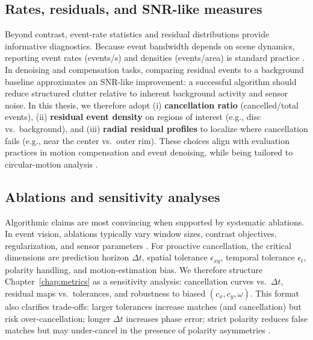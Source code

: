 \subsection{Rates, residuals, and SNR-like measures}
Beyond contrast, event-rate statistics and residual distributions provide informative diagnostics. Because event bandwidth depends on scene dynamics, reporting event rates (events/s) and densities (events/area) is standard practice \cite{Gallego2020Survey}. In denoising and compensation tasks, comparing residual events to a background baseline approximates an SNR-like improvement: a successful algorithm should reduce structured clutter relative to inherent background activity and sensor noise. In this thesis, we therefore adopt (i) \textbf{cancellation ratio} (cancelled/total events), (ii) \textbf{residual event density} on regions of interest (e.g., disc vs.\ background), and (iii) \textbf{radial residual profiles} to localize where cancellation fails (e.g., near the center vs.\ outer rim). These choices align with evaluation practices in motion compensation and event denoising, while being tailored to circular-motion analysis \cite{Bardow2016SOFIE,Gallego2018CMax,Xu2020}.

\subsection{Ablations and sensitivity analyses}
Algorithmic claims are most convincing when supported by systematic ablations. In event vision, ablations typically vary window sizes, contrast objectives, regularization, and sensor parameters \cite{Gallego2018CMax,Rebecq2017}. For proactive cancellation, the critical dimensions are prediction horizon $\Delta t$, spatial tolerance $\epsilon_{xy}$, temporal tolerance $\epsilon_t$, polarity handling, and motion-estimation bias. We therefore structure Chapter~\ref{chap:metrics} as a sensitivity analysis: cancellation curves vs.\ $\Delta t$, residual maps vs.\ tolerances, and robustness to biased $(c_x,c_y,\omega)$. This format also clarifies trade-offs: larger tolerances increase matches (and cancellation) but risk over-cancellation; longer $\Delta t$ increases phase error; strict polarity reduces false matches but may under-cancel in the presence of polarity asymmetries \cite{Gallego2020Survey,Delbruck2020}.

